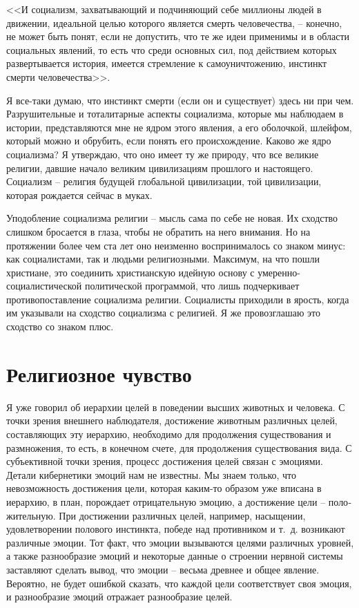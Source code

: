 \documentclass{book}
\begin{document}
<<И социализм, захватывающий и подчиняющий себе миллио­ны людей в движении, идеальной целью которого является смерть человечества, -- конечно, не может быть понят, если не допустить, что те же идеи применимы и в области социальных явлений, то есть что среди основных сил, под действием кото­рых развертывается история, имеется стремление к самоунич­тожению, инстинкт смерти человечества>>. 

Я все-таки думаю, что инстинкт смерти (если он и сущест­вует) здесь ни при чем. Разрушительные и тоталитарные аспек­ты социализма, которые мы наблюдаем в истории, представля­ются мне не ядром этого явления, а его оболочкой, шлейфом, который можно и обрубить, если понять его происхождение. Каково же ядро социализма? Я утверждаю, что оно имеет ту же природу, что все великие религии, давшие начало великим цивилизациям прошлого и настоящего. Социализм -- религия будущей глобальной цивилизации, той цивилизации, которая рождается сейчас в муках.

Уподобление социализма религии -- мысль сама по себе не новая. Их сходство слишком бросается в глаза, чтобы не обра­тить на него внимания. Но на протяжении более чем ста лет оно неизменно воспринималось со знаком минус: как социа­листами, так и людьми религиозными. Максимум, на что пошли христиане, это соединить христианскую идейную основу с  уме­ренно-социалистической политической программой,  что лишь подчеркивает противопоставление социализма религии. Социа­листы приходили в ярость, когда им указывали на сходство социализма с религией. Я же провозглашаю это сходство со знаком плюс.


\section{Религиозное чувство}

Я уже говорил об иерархии целей в поведении высших живот­ных и человека. С точки зрения внешнего наблюдателя, достиже­ние животным различных целей, составляющих эту иерархию, необходимо для продолжения существования и размножения, то есть, в конечном счете, для продолжения существования вида. С субъективной точки зрения, процесс достижения целей связан с эмоциями.  Детали кибернетики эмоций нам не извест­ны. Мы знаем только, что невозможность достижения цели, которая каким-то образом уже вписана в иерархию, в план, порождает отрицательную эмоцию, а достижение цели -- поло­жительную. При достижении различных целей, например, насыщении, удовлетворении полового инстинкта, победе над противником и т.~д. возникают различные эмоции. Тот факт, что эмоции вызываются целями различных уровней, а также разнообразие эмоций и некоторые данные о строении нервной системы заставляют сделать вывод, что эмоции -- весьма древнее и общее явление. Вероятно, не будет ошибкой сказать, что каждой цели соответствует своя эмоция, и 
разнообразие эмоций отражает разнообразие целей.
\end{document}
